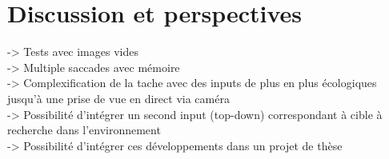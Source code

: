 
\chapter{Discussion et perspectives} %

\label{Discussion} %


-> Tests avec images vides \\
-> Multiple saccades avec mémoire \\
-> Complexification de la tache avec des inputs de plus en plus écologiques jusqu'à une prise de vue en direct via caméra \\
-> Possibilité d'intégrer un second input (top-down) correspondant à cible à recherche dans l'environnement \\
-> Possibilité d'intégrer ces développements dans un projet de thèse